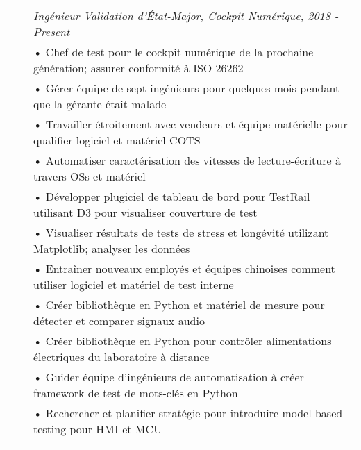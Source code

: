 \documentclass{minimal}
\begin{document}
\begin{tabular}{ p{1.5cm} p{1cm} p{16cm} }
& & \textit{Ingénieur Validation d'État-Major, Cockpit Numérique, 2018 - Present}\\
& & • Chef de test pour le cockpit numérique de la prochaine génération; assurer conformité à ISO 26262\\
& & • Gérer équipe de sept ingénieurs pour quelques mois pendant que la gérante était malade\\
& & • Travailler étroitement avec vendeurs et équipe matérielle pour qualifier logiciel et matériel COTS\\
& & • Automatiser caractérisation des vitesses de lecture-écriture à travers OSs et matériel\\
& & • Développer plugiciel de tableau de bord pour TestRail utilisant D3 pour visualiser couverture de test\\
& & • Visualiser résultats de tests de stress et longévité utilizant Matplotlib; analyser les données\\
& & • Entraîner nouveaux employés et équipes chinoises comment utiliser logiciel et matériel de test interne\\
& & • Créer bibliothèque en Python et matériel de mesure pour détecter et comparer signaux audio\\
& & • Créer bibliothèque en Python pour contrôler alimentations électriques du laboratoire à distance\\ 
& & • Guider équipe d'ingénieurs de automatisation à créer framework de test de mots-clés en Python\\
& & • Rechercher et planifier stratégie pour introduire model-based testing pour HMI et MCU\\
& & \\
\end{tabular}
\end{document}
